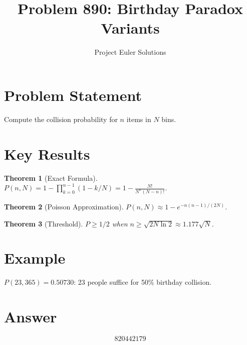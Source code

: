 \documentclass[11pt]{article}
\title{Problem 890: Birthday Paradox Variants}
\author{Project Euler Solutions}
\date{}
\newtheorem{theorem}{Theorem}
\begin{document}
\maketitle

\section{Problem Statement}
Compute the collision probability for $n$ items in $N$ bins.

\section{Key Results}

\begin{theorem}[Exact Formula]
$P(n,N) = 1 - \prod_{k=0}^{n-1}(1-k/N) = 1 - \frac{N!}{N^n(N-n)!}$.
\end{theorem}

\begin{theorem}[Poisson Approximation]
$P(n,N) \approx 1 - e^{-n(n-1)/(2N)}$.
\end{theorem}

\begin{theorem}[Threshold]
$P \ge 1/2$ when $n \ge \sqrt{2N\ln 2} \approx 1.177\sqrt{N}$.
\end{theorem}

\section{Example}
$P(23, 365) = 0.50730$: 23 people suffice for 50\% birthday collision.

\section{Answer}

\[
\boxed{820442179}
\]
\end{document}
